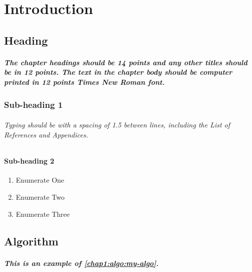 \chapter{Introduction}
\label{chapter1}





\section{Heading}


\paragraph{The chapter headings should be 14 points and any other titles should be in 12 points.  The text in the chapter body should be computer printed in 12 points Times New Roman font.}



\subsection{Sub-heading 1}

\subparagraph{
Typing should be with a spacing of 1.5 between lines, including the List of References and Appendices.
}






\subsubsection{Sub-heading 2}

\subsubparagraph{
\lipsum[1][1-3] %
}

\begin{enumerate}[itemindent=\subsubparitemindent]
\item Enumerate One
\item Enumerate Two
\item Enumerate Three
\end{enumerate}





\section{Algorithm}

\paragraph{This is an example of \autoref{chap1:algo:my-algo}.}

